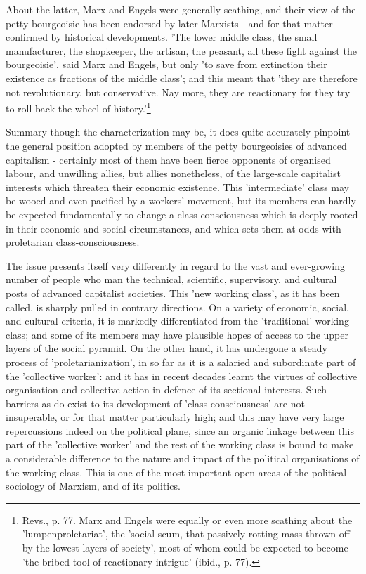 About the latter, Marx and Engels were generally scathing, and their view of the petty bourgeoisie has been endorsed by later Marxists - and for that matter confirmed by historical developments. 'The lower middle class, the small manufacturer, the shopkeeper, the artisan, the peasant, all these fight against the bourgeoisie', said Marx and Engels, but only 'to save from extinction their existence as fractions of the middle class'; and this meant that 'they are therefore not revolutionary, but conservative. Nay more, they are reactionary for they try to roll back the wheel of history.'\footnote{Revs., p. 77. Marx and Engels were equally or even more scathing about the 'lumpenproletariat', the 'social scum, that passively rotting mass thrown off by the lowest layers of society', most of whom could be expected to become 'the bribed tool of reactionary intrigue' (ibid., p. 77).}

Summary though the characterization may be, it does quite accurately pinpoint the general position adopted by members of the petty bourgeoisies of advanced capitalism - certainly most of them have been fierce opponents of organised labour, and unwilling allies, but allies nonetheless, of the large-scale capitalist interests which threaten their economic existence. This 'intermediate' class may be wooed and even pacified by a workers' movement, but its members can hardly be expected fundamentally to change a class-consciousness which is deeply rooted in their economic and social circumstances, and which sets them at odds with proletarian class-consciousness.

The issue presents itself very differently in regard to the vast and ever\hyp{}growing number of people who man the technical, scientific, supervisory, and cultural posts of advanced capitalist societies. This 'new working class', as it has been called, is sharply pulled in contrary directions. On a variety of economic, social, and cultural criteria, it is markedly differentiated from the 'traditional' working class; and some of its members may have plausible hopes of access to the upper layers of the social pyramid. On the other hand, it has undergone a steady process of 'proletarianization', in so far as it is a salaried and subordinate part of the 'collective worker': and it has in recent decades learnt the virtues of collective organisation and collective action in defence of its sectional interests. Such barriers as do exist to its development of 'class-consciousness' are not insuperable, or for that matter particularly high; and this may have very large repercussions indeed on the political plane, since an organic linkage between this part of the 'collective worker' and the rest of the working class is bound to make a considerable difference to the nature and impact of the political organisations of the working class. This is one of the most important open areas of the political sociology of Marxism, and of its politics.

